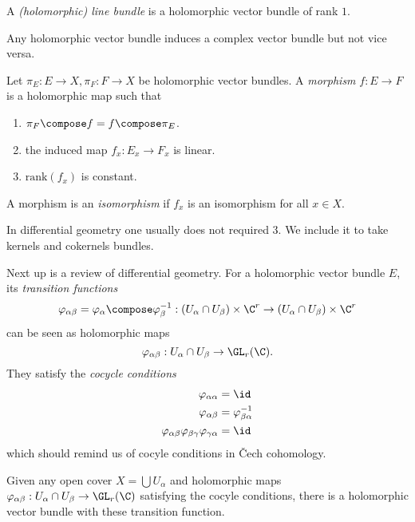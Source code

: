 \documentclass[a4paper]{article}
\begin{document}
\begin{definition}
  A \emph{(holomorphic) line bundle} is a holomorphic vector bundle of rank \(1\).
\end{definition}

Any holomorphic vector bundle induces a complex vector bundle but not vice versa.

\begin{definition}
  Let \(\pi_E: E \to X, \pi_F: F \to X\) be holomorphic vector bundles. A \emph{morphism} \(f: E \to F\) is a holomorphic map such that
  \begin{enumerate}
  \item \(\pi_F \compose f = f \compose \pi_E\).
  \item the induced map \(f_x: E_x \to F_x\) is linear.
  \item \(\text{rank}(f_x)\) is constant.
  \end{enumerate}

  A morphism is an \emph{isomorphism} if \(f_x\) is an isomorphism for all \(x \in X\).
\end{definition}

\begin{remark}
  In differential geometry one usually does not required 3. We include it to take kernels and cokernels bundles.
\end{remark}

Next up is a review of differential geometry. For a holomorphic vector bundle \(E\), its \emph{transition functions}
\[
  \varphi_{\alpha\beta} = \varphi_\alpha \compose \varphi_\beta^{-1}: (U_\alpha \cap U_\beta) \times \C^r \to (U_\alpha \cap U_\beta) \times \C^r 
\]
can be seen as holomorphic maps
\[
  \varphi_{\alpha\beta}: U_\alpha \cap U_\beta \to \GL_r(\C).
\]
They satisfy the \emph{cocycle conditions}
\begin{align*}
  \varphi_{\alpha\alpha} &= \id \\
  \varphi_{\alpha\beta} &= \varphi_{\beta\alpha}^{-1} \\
  \varphi_{\alpha\beta} \varphi_{\beta\gamma} \varphi_{\gamma\alpha} &= \id
\end{align*}
which should remind us of cocyle conditions in Čech cohomology.

\begin{proposition}
  Given any open cover \(X = \bigcup U_\alpha\) and holomorphic maps \(\varphi_{\alpha\beta}: U_\alpha \cap U_\beta \to \GL_r(\C)\) satisfying the cocyle conditions, there is a holomorphic vector bundle with these transition function.
\end{proposition}
\end{document}
